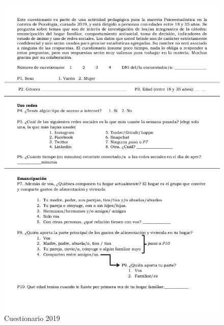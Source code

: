\documentclass[]{book}
\begin{document}
\begin{figure}

{\centering \includegraphics{imagenes/cuestionario2019_01} 

}

\caption{Cuestionario 2019}\label{fig:cuestionario}
\end{figure}
\end{document}
